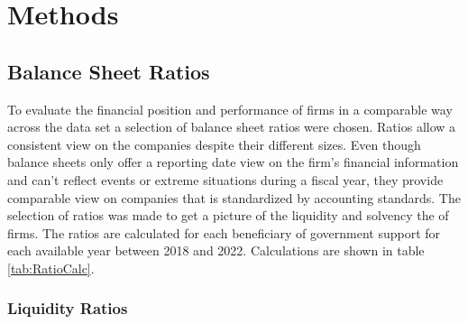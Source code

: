 
\chapter{Methods} %

\label{Chapter4} %


\section{Balance Sheet Ratios}

To evaluate the financial position and performance of firms in a comparable way across the data set a selection of balance sheet ratios were chosen. Ratios allow a consistent view on the companies despite their different sizes. Even though balance sheets only offer a reporting date view on the firm’s financial information and can’t reflect events or extreme situations during a fiscal year, they provide comparable view on companies that is standardized by accounting standards.  The selection of ratios was made to get a picture of the liquidity and solvency the of firms. The ratios are calculated for each beneficiary of government support for each available year between 2018 and 2022. Calculations are shown in table \ref{tab:RatioCalc}.

\subsection{Liquidity Ratios}

